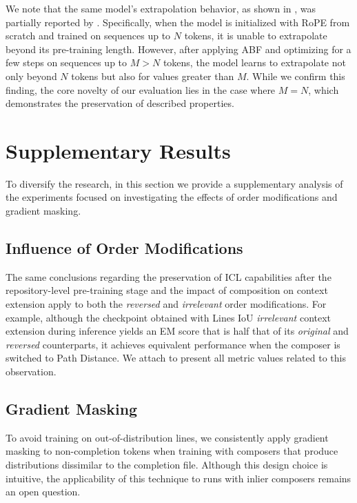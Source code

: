 We note that the same model's extrapolation behavior, as shown in , was partially reported by \citet{rozière2023}. Specifically, when the model is initialized with RoPE from scratch and trained on sequences up to \(N\) tokens, it is unable to extrapolate beyond its pre-training length. However, after applying ABF and optimizing for a few steps on sequences up to \(M > N\) tokens, the model learns to extrapolate not only beyond \(N\) tokens but also for values greater than \(M\). While we confirm this finding, the core novelty of our evaluation lies in the case where \(M = N\), which demonstrates the preservation of described properties.

\section{Supplementary Results}

To diversify the research, in this section we provide a supplementary analysis of the experiments focused on investigating the effects of order modifications and gradient masking.

\subsection{Influence of Order Modifications}

The same conclusions regarding the preservation of ICL capabilities after the repository-level pre-training stage and the impact of composition on context extension apply to both the \textit{reversed} and \textit{irrelevant} order modifications. For example, although the checkpoint obtained with Lines IoU \textit{irrelevant} context extension during inference yields an EM score that is half that of its \textit{original} and \textit{reversed} counterparts, it achieves equivalent performance when the composer is switched to Path Distance. We attach  to present all metric values related to this observation.

\subsection{Gradient Masking}\label{sec:gradient-masking}

To avoid training on out-of-distribution lines, we consistently apply gradient masking to non-completion tokens when training with composers that produce distributions dissimilar to the completion file. Although this design choice is intuitive, the applicability of this technique to runs with inlier composers remains an open question.

